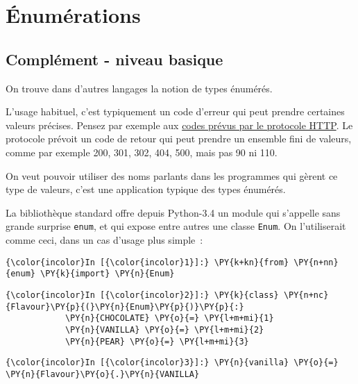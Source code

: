     
    
    
    

    

    \hypertarget{uxe9numuxe9rations}{%
\section{Énumérations}\label{uxe9numuxe9rations}}

    \hypertarget{compluxe9ment---niveau-basique}{%
\subsection{Complément - niveau
basique}\label{compluxe9ment---niveau-basique}}

    On trouve dans d'autres langages la notion de types énumérés.

    L'usage habituel, c'est typiquement un code d'erreur qui peut prendre
certaines valeurs précises. Pensez par exemple aux
\href{https://fr.wikipedia.org/wiki/Liste_des_codes_HTTP}{codes prévus
par le protocole HTTP}. Le protocole prévoit un code de retour qui peut
prendre un ensemble fini de valeurs, comme par exemple 200, 301, 302,
404, 500, mais pas 90 ni 110.

    On veut pouvoir utiliser des noms parlants dans les programmes qui
gèrent ce type de valeurs, c'est une application typique des types
énumérés.

    La bibliothèque standard offre depuis Python-3.4 un module qui s'appelle
sans grande surprise \texttt{enum}, et qui expose entre autres une
classe \texttt{Enum}. On l'utiliserait comme ceci, dans un cas d'usage
plus simple~:

    \begin{Verbatim}[commandchars=\\\{\}]
{\color{incolor}In [{\color{incolor}1}]:} \PY{k+kn}{from} \PY{n+nn}{enum} \PY{k}{import} \PY{n}{Enum}
\end{Verbatim}


    \begin{Verbatim}[commandchars=\\\{\}]
{\color{incolor}In [{\color{incolor}2}]:} \PY{k}{class} \PY{n+nc}{Flavour}\PY{p}{(}\PY{n}{Enum}\PY{p}{)}\PY{p}{:}
            \PY{n}{CHOCOLATE} \PY{o}{=} \PY{l+m+mi}{1}
            \PY{n}{VANILLA} \PY{o}{=} \PY{l+m+mi}{2}
            \PY{n}{PEAR} \PY{o}{=} \PY{l+m+mi}{3}
\end{Verbatim}


    \begin{Verbatim}[commandchars=\\\{\}]
{\color{incolor}In [{\color{incolor}3}]:} \PY{n}{vanilla} \PY{o}{=} \PY{n}{Flavour}\PY{o}{.}\PY{n}{VANILLA}
\end{Verbatim}


